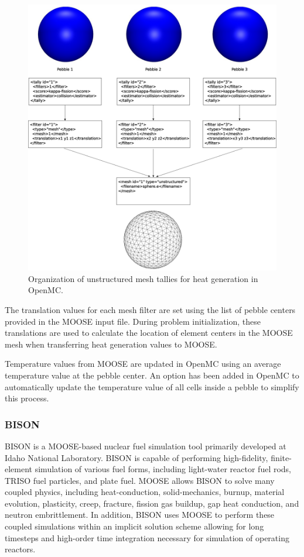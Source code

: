 \begin{figure}[ht]
    \centering
    \includegraphics[width=\textwidth]{Figures/umesh_tally_diagram}
    \caption{Organization of unstructured mesh tallies for heat generation in OpenMC.}
    \label{fig:umesh_tally_steup}
\end{figure}

The translation values for each mesh filter are set using the list of pebble centers provided in the MOOSE input file. During problem initialization, these translations are used to calculate the location of element centers in the MOOSE mesh when transferring heat generation values to MOOSE.

Temperature values from MOOSE are updated in OpenMC using an average temperature value at the pebble center. An option has been added in OpenMC to automatically update the temperature value of all cells inside a pebble to simplify this process.

\subsubsection{BISON}

BISON is a MOOSE-based \cite{hales2013triso, williamson2012multidimensional} nuclear fuel simulation tool primarily developed at Idaho National Laboratory.
BISON is capable of performing high-fidelity, finite-element simulation of various fuel forms, including
light-water reactor fuel rods, TRISO fuel particles, and plate fuel. MOOSE allows BISON to solve many
coupled physics, including heat-conduction, solid-mechanics, burnup, material evolution, plasticity, creep,
fracture, fission gas buildup, gap heat conduction, and neutron embrittlement. In addition, BISON uses
MOOSE to perform these coupled simulations within an implicit solution scheme allowing for long timesteps
and high-order time integration necessary for simulation of operating reactors.

